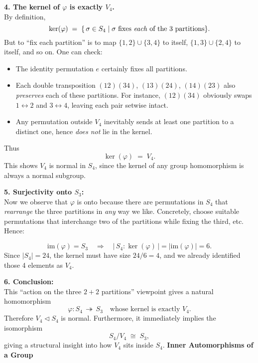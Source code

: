 \documentclass[12pt]{article}
\theoremstyle{definition} %
\theoremstyle{plain} %
\begin{document}
\bigskip

\noindent
\textbf{4. The kernel of $\varphi$ is exactly $V_4$.}\\
By definition,
\[
\ker(\varphi) 
\;=\; \{\, \sigma \in S_4 \mid \text{$\sigma$ fixes \emph{each} of the 3 partitions}\}.
\]
But to “fix each partition” is to map $\{1,2\}\cup \{3,4\}$ to itself, $\{1,3\}\cup\{2,4\}$ to itself, and so on. One can check:

\begin{itemize}
\item The identity permutation $e$ certainly fixes all partitions.
\item Each double transposition $(12)(34)$, $(13)(24)$, $(14)(23)$ also \emph{preserves} each of these partitions.  For instance, $(12)(34)$ obviously swaps $1\leftrightarrow 2$ and $3\leftrightarrow 4$, leaving each pair setwise intact.
\item Any permutation outside $V_4$ inevitably sends at least one partition to a distinct one, hence \emph{does not} lie in the kernel.
\end{itemize}

Thus
\[
\ker(\varphi) \;=\; V_4.
\]
This shows $V_4$ is normal in $S_4$, since the kernel of any group homomorphism is always a normal subgroup.

\bigskip

\noindent
\textbf{5. Surjectivity onto $S_3$:}\\
Now we observe that $\varphi$ is onto because there are permutations in $S_4$ that \emph{rearrange} the three partitions in \emph{any} way we like. Concretely, choose suitable permutations that interchange two of the partitions while fixing the third, etc. Hence:

\[
\mathrm{im}(\varphi) = S_3
\quad\Longrightarrow\quad
|\,S_4 : \ker(\varphi)\,| = |\mathrm{im}(\varphi)| = 6.
\]
Since $|S_4|=24$, the kernel must have size $24/6=4$, and we already identified those 4 elements as $V_4$.

\bigskip

\noindent
\textbf{6. Conclusion:}\\
This “action on the three $2+2$ partitions” viewpoint gives a natural homomorphism
\[
\varphi: S_4 \,\twoheadrightarrow\, S_3
\quad
\text{whose kernel is exactly }V_4.
\]
Therefore $V_4 \triangleleft S_4$ is normal. Furthermore, it immediately implies the isomorphism
\[
S_4 / V_4 \;\cong\; S_3,
\]
giving a structural insight into how $V_4$ sits inside $S_4$.
\noindent
\textbf{Inner Automorphisms of a Group}
\end{document}
